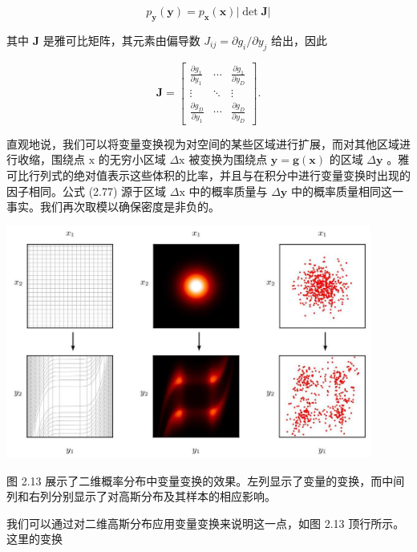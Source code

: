 \documentclass[10pt]{article}
\begin{document}
\[
{p}_{\mathbf{y}}\left( \mathbf{y}\right)  = {p}_{\mathbf{x}}\left( \mathbf{x}\right) \left| {\det \mathbf{J}}\right|  \tag{2.76}
\]

其中 \(\mathbf{J}\) 是雅可比矩阵，其元素由偏导数 \({J}_{ij} = \partial {g}_{i}/\partial {y}_{j}\) 给出，因此

\[
\mathbf{J} = \left\lbrack  \begin{matrix} \frac{\partial {g}_{1}}{\partial {y}_{1}} & \cdots & \frac{\partial {g}_{1}}{\partial {y}_{D}} \\  \vdots &  \ddots  & \vdots \\  \frac{\partial {g}_{D}}{\partial {y}_{1}} & \cdots & \frac{\partial {g}_{D}}{\partial {y}_{D}} \end{matrix}\right\rbrack  . \tag{2.77}
\]

直观地说，我们可以将变量变换视为对空间的某些区域进行扩展，而对其他区域进行收缩，围绕点 \(\mathrm{x}\) 的无穷小区域 \(\Delta \mathrm{x}\) 被变换为围绕点 \(\mathbf{y} = \mathbf{g}\left( \mathbf{x}\right)\) 的区域 \(\Delta \mathbf{y}\) 。雅可比行列式的绝对值表示这些体积的比率，并且与在积分中进行变量变换时出现的因子相同。公式 (2.77) 源于区域 \(\Delta \mathrm{x}\) 中的概率质量与 \(\Delta \mathbf{y}\) 中的概率质量相同这一事实。我们再次取模以确保密度是非负的。

\begin{center}
\includegraphics[max width=0.9\textwidth]{images/0194e279-9b28-703a-88f4-c3ac21e2010d_64_290_359_1210_772_0.jpg}
\end{center}
\hspace*{3em} 

图 2.13 展示了二维概率分布中变量变换的效果。左列显示了变量的变换，而中间列和右列分别显示了对高斯分布及其样本的相应影响。

我们可以通过对二维高斯分布应用变量变换来说明这一点，如图 2.13 顶行所示。这里的变换
\end{document}
